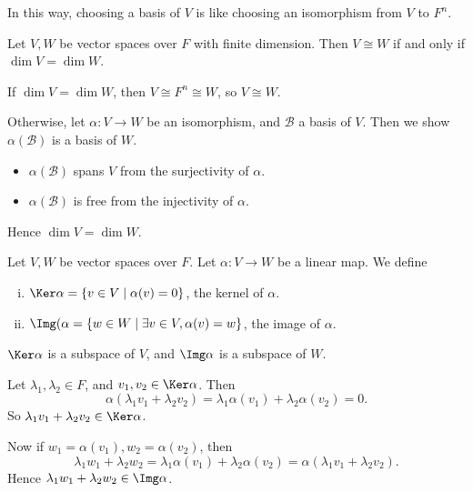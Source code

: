 \documentclass[12pt]{article}
\begin{document}
\begin{remark}
	In this way, choosing a basis of $V$ is like choosing an isomorphism from $V$ to $F^{n}$.
\end{remark}

\begin{theorem}
	Let $V, W$ be vector spaces over $F$ with finite dimension. Then $V \cong W$ if and only if $\dim V = \dim W$.
\end{theorem}

\begin{proofbox}
	If $\dim V = \dim W$, then $V \cong F^{n} \cong W$, so $V \cong W$.

Otherwise, let $\alpha : V \to W$ be an isomorphism, and $\mathcal{B}$ a basis of $V$. Then we show $\alpha(\mathcal{B})$ is a basis of $W$.
\begin{itemize}
	\item $\alpha(\mathcal{B})$ spans $V$ from the surjectivity of $\alpha$.
	\item $\alpha(\mathcal{B})$ is free from the injectivity of $\alpha$.
\end{itemize}
Hence $\dim V = \dim W$.
\end{proofbox}

\begin{definition}
	Let $V, W$ be vector spaces over $F$. Let $\alpha : V \to W$ be a linear map. We define
	\begin{enumerate}[(i)]
	\item $\Ker \alpha = \{v \in V \mid \alpha(v) = 0\}$, the kernel of $\alpha$.
	\item  $\Img(\alpha = \{w \in W \mid \exists v \in V, \alpha(v) = w\}$, the image of $\alpha$.
	\end{enumerate}
\end{definition}

\begin{lemma}
	$\Ker \alpha$ is a subspace of $V$, and $\Img \alpha$ is a subspace of $W$.
\end{lemma}

\begin{proofbox}
	Let $\lambda_1, \lambda_2 \in F$, and $v_1, v_2 \in \Ker \alpha$. Then
\[
	\alpha (\lambda_1 v_1 + \lambda_2 v_2) = \lambda_1 \alpha(v_1) + \lambda_2 \alpha(v_2) = 0
.\]
So $\lambda_1 v_1 + \lambda_2 v_2 \in \Ker \alpha$.

Now if $w_1 = \alpha(v_1), w_2 = \alpha (v_2)$, then
 \[
	 \lambda_1 w_1 + \lambda_2 w_2 = \lambda_1 \alpha(v_1) + \lambda_2 \alpha(v_2) = \alpha(\lambda_1 v_1 + \lambda_2 v_2)
.\]
Hence $\lambda_1 w_1 + \lambda_2 w_2 \in \Img \alpha$.
\end{proofbox}
\end{document}
